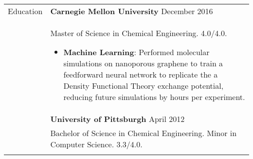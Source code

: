 \documentclass[11pt]{article}
\begin{document}
\begin{tabular}[t]{@{}p{1.05in} @{}p{6.00in}}

{Education}
&
\textbf{Carnegie Mellon University} \hfill December 2016 \\ &
Master of Science in Chemical Engineering. 4.0/4.0. 
\begin{itemize}
    \item \textbf{Machine Learning}: Performed molecular simulations on nanoporous graphene to train a feedforward neural network to replicate the a Density Functional Theory exchange potential, reducing future simulations by hours per experiment.
\end{itemize}
\\
&
\textbf{University of Pittsburgh} \hfill April 2012 \\ &
Bachelor of Science in Chemical Engineering. Minor in Computer Science. 3.3/4.0. 
\\
\\


\end{tabular}
\end{document}

